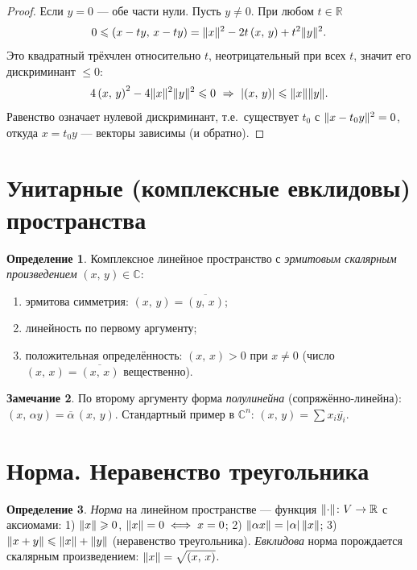 \documentclass[11pt,a4paper]{article}
\theoremstyle{definition}
\newtheorem{definition}{Определение}[section]
\newtheorem{remark}[definition]{Замечание}
\theoremstyle{plain}
\newcommand{\R}{\mathbb{R}}
\newcommand{\C}{\mathbb{C}}
\renewcommand{\le}{\leqslant}
\renewcommand{\ge}{\geqslant}
\newcommand{\scal}[2]{\left( #1,\,#2\right)}
\DeclarePairedDelimiter{\abs}{\lvert}{\rvert}
\DeclarePairedDelimiter{\norm}{\lVert}{\rVert}
\begin{document}
\begin{proof}
Если $y=0$ — обе части нули. Пусть $y\ne0$. При любом $t\in\R$
\[
  0\le\scal{x-ty}{x-ty}=\norm x^2-2t\scal xy+t^2\norm y^2 .
\]
Это квадратный трёхчлен относительно $t$, неотрицательный при всех $t$, значит его дискриминант
$\le0$:
\[
  4\scal xy^2-4\norm x^2\norm y^2\le0\ \Rightarrow\ \abs{\scal xy}\le\norm x\norm y .
\]
Равенство означает нулевой дискриминант, т.е.\ существует $t_0$ с $\norm{x-t_0y}^2=0$, откуда
$x=t_0y$ — векторы зависимы (и обратно).
\end{proof}

\section{Унитарные (комплексные евклидовы) пространства}

\begin{definition}
Комплексное линейное пространство с \emph{эрмитовым скалярным произведением} $\scal xy\in\C$:
\begin{enumerate}[label=\arabic*),leftmargin=*,nosep]
  \item эрмитова симметрия: $\scal xy=\overline{\scal yx}$;
  \item линейность по первому аргументу;
  \item положительная определённость: $\scal xx>0$ при $x\ne0$ (число $\scal xx=\overline{\scal xx}$
        вещественно).
\end{enumerate}
\end{definition}

\begin{remark}
По второму аргументу форма \emph{полулинейна} (сопряжённо-линейна):
$\scal x{\alpha y}=\overline\alpha\,\scal xy$. Стандартный пример в $\C^n$:
$\scal xy=\sum x_i\overline{y_i}$.
\end{remark}

\section{Норма. Неравенство треугольника}

\begin{definition}
\emph{Норма} на линейном пространстве — функция $\norm{\cdot}\colon V\to\R$ с аксиомами:
1) $\norm x\ge0$, $\norm x=0\iff x=0$; 2) $\norm{\alpha x}=\abs\alpha\,\norm x$;
3) $\norm{x+y}\le\norm x+\norm y$ (неравенство треугольника).
\emph{Евклидова} норма порождается скалярным произведением: $\norm x=\sqrt{\scal xx}$.
\end{definition}
\end{document}
